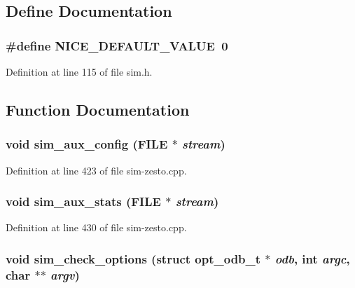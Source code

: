 \subsection{Define Documentation}
\subsubsection[{NICE\_\-DEFAULT\_\-VALUE}]{\setlength{\rightskip}{0pt plus 5cm}\#define NICE\_\-DEFAULT\_\-VALUE~0}\label{sim_8h_d532132f299e8f6d3961f66ef637f5aa}




Definition at line 115 of file sim.h.

\subsection{Function Documentation}
\subsubsection[{sim\_\-aux\_\-config}]{\setlength{\rightskip}{0pt plus 5cm}void sim\_\-aux\_\-config (FILE $\ast$ {\em stream})}\label{sim_8h_67e5d7a21600d2eb1fb2f0798fc24a7c}




Definition at line 423 of file sim-zesto.cpp.
\subsubsection[{sim\_\-aux\_\-stats}]{\setlength{\rightskip}{0pt plus 5cm}void sim\_\-aux\_\-stats (FILE $\ast$ {\em stream})}\label{sim_8h_f0d3b44eaaad1fd53b38c9f82deb05fd}




Definition at line 430 of file sim-zesto.cpp.
\subsubsection[{sim\_\-check\_\-options}]{\setlength{\rightskip}{0pt plus 5cm}void sim\_\-check\_\-options (struct {\bf opt\_\-odb\_\-t} $\ast$ {\em odb}, \/  int {\em argc}, \/  char $\ast$$\ast$ {\em argv})}\label{sim_8h_d6c7eccd0fa4b587be632b532e3b3e04}




